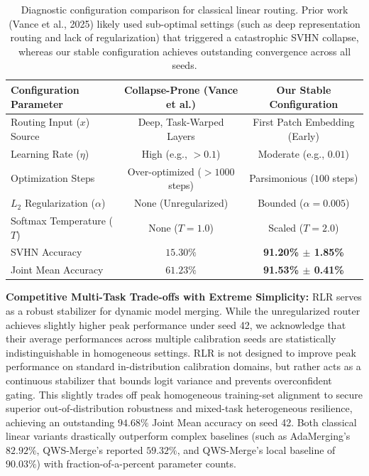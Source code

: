 \begin{table}[t]
\caption{Diagnostic configuration comparison for classical linear routing. Prior work (Vance et al., 2025) likely used sub-optimal settings (such as deep representation routing and lack of regularization) that triggered a catastrophic SVHN collapse, whereas our stable configuration achieves outstanding convergence across all seeds.}
\label{tab:diagnostic}
\vskip 0.15in
\begin{center}
\begin{small}
\begin{sc}
\begin{tabular}{lcc}
\toprule
Configuration Parameter & Collapse-Prone (Vance et al.) & Our Stable Configuration \\
\midrule
Routing Input ($x$) Source & Deep, Task-Warped Layers & First Patch Embedding (Early) \\
Learning Rate ($\eta$) & High (e.g., $>0.1$) & Moderate (e.g., $0.01$) \\
Optimization Steps & Over-optimized ($>1000$ steps) & Parsimonious ($100$ steps) \\
$L_2$ Regularization ($\alpha$) & None (Unregularized) & Bounded ($\alpha=0.005$) \\
Softmax Temperature ($T$) & None ($T=1.0$) & Scaled ($T=2.0$) \\
\midrule
SVHN Accuracy & $15.30\%$ & \textbf{91.20\% $\pm$ 1.85\%} \\
Joint Mean Accuracy & $61.23\%$ & \textbf{91.53\% $\pm$ 0.41\%} \\
\bottomrule
\end{tabular}
\end{sc}
\end{small}
\end{center}
\vskip -0.1in
\end{table}

\textbf{Competitive Multi-Task Trade-offs with Extreme Simplicity:} RLR serves as a robust stabilizer for dynamic model merging. While the unregularized router achieves slightly higher peak performance under seed 42, we acknowledge that their average performances across multiple calibration seeds are statistically indistinguishable in homogeneous settings. RLR is not designed to improve peak performance on standard in-distribution calibration domains, but rather acts as a continuous stabilizer that bounds logit variance and prevents overconfident gating. This slightly trades off peak homogeneous training-set alignment to secure superior out-of-distribution robustness and mixed-task heterogeneous resilience, achieving an outstanding $94.68\%$ Joint Mean accuracy on seed 42. Both classical linear variants drastically outperform complex baselines (such as AdaMerging's $82.92\%$, QWS-Merge's reported $59.32\%$, and QWS-Merge's local baseline of $90.03\%$) with fraction-of-a-percent parameter counts.

